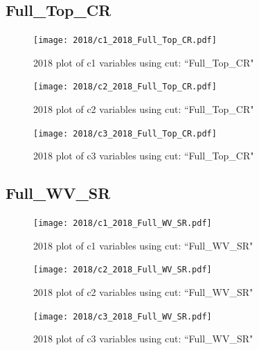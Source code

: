 \documentclass{article}
\begin{document}
      \subsection*{Full\_Top\_CR}
                        \begin{figure}[H]
                            \centering
                            \caption{2018 plot of c1 variables using cut: ``Full\_Top\_CR"}
                            \texttt{[image: 2018/c1\_2018\_Full\_Top\_CR.pdf]}
                        \end{figure}    
                        \begin{figure}[H]
                            \centering
                            \caption{2018 plot of c2 variables using cut: ``Full\_Top\_CR"}
                            \texttt{[image: 2018/c2\_2018\_Full\_Top\_CR.pdf]}
                        \end{figure}    
                        \begin{figure}[H]
                            \centering
                            \caption{2018 plot of c3 variables using cut: ``Full\_Top\_CR"}
                            \texttt{[image: 2018/c3\_2018\_Full\_Top\_CR.pdf]}
                        \end{figure}    
      \subsection*{Full\_WV\_SR}
                        \begin{figure}[H]
                            \centering
                            \caption{2018 plot of c1 variables using cut: ``Full\_WV\_SR"}
                            \texttt{[image: 2018/c1\_2018\_Full\_WV\_SR.pdf]}
                        \end{figure}    
                        \begin{figure}[H]
                            \centering
                            \caption{2018 plot of c2 variables using cut: ``Full\_WV\_SR"}
                            \texttt{[image: 2018/c2\_2018\_Full\_WV\_SR.pdf]}
                        \end{figure}    
                        \begin{figure}[H]
                            \centering
                            \caption{2018 plot of c3 variables using cut: ``Full\_WV\_SR"}
                            \texttt{[image: 2018/c3\_2018\_Full\_WV\_SR.pdf]}
                        \end{figure}    
\end{document}
